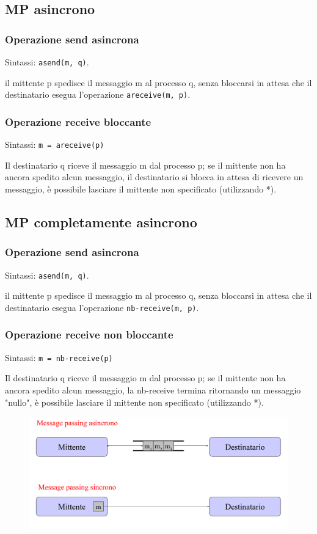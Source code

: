 \subsection{MP asincrono}
\subsubsection{Operazione send asincrona}
Sintassi: \lstinline{asend(m, q)}.

il mittente p spedisce il messaggio m al processo q, senza bloccarsi in attesa che il destinatario esegua l'operazione \lstinline{areceive(m, p)}.

\subsubsection{Operazione receive bloccante}
Sintassi: \lstinline{m = areceive(p)}

Il destinatario q riceve il messaggio m dal processo p; se il mittente non ha ancora spedito alcun messaggio, il destinatario si blocca in attesa di ricevere un messaggio, è possibile lasciare il mittente non specificato (utilizzando *).

\subsection{MP completamente asincrono}
\subsubsection{Operazione send asincrona}
Sintassi: \lstinline{asend(m, q)}.

il mittente p spedisce il messaggio m al processo q, senza bloccarsi in attesa che il destinatario esegua l'operazione \lstinline{nb-receive(m, p)}.

\subsubsection{Operazione receive non bloccante}
Sintassi: \lstinline{m = nb-receive(p)}

Il destinatario q riceve il messaggio m dal processo p; se il mittente non ha ancora spedito alcun messaggio, la nb-receive termina ritornando un messaggio "nullo", è possibile lasciare il mittente non specificato (utilizzando *).

\begin{figure} [h]
    \centering
    \includegraphics[width=0.7\linewidth]{Images/Screenshot 2025-01-16 at 13-17-46 so-03.1-concorrenza - so-03.1-concorrenza.pdf.png}
\end{figure}

